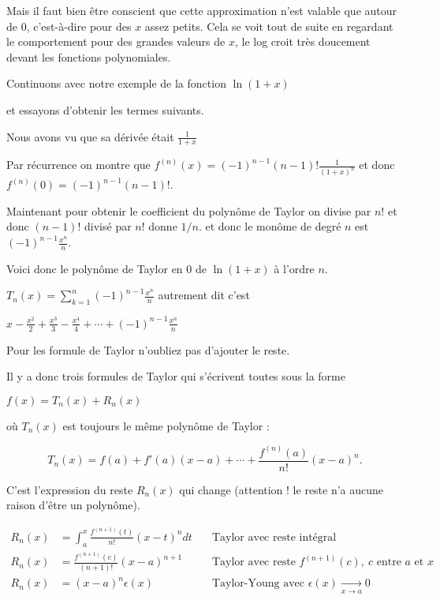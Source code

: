 Mais il faut bien être conscient que cette approximation n'est valable que autour 
de $0$, c'est-à-dire pour des $x$ assez petits.
Cela se voit tout de suite en regardant le comportement pour des grandes valeurs de $x$,
le log croit très doucement devant les fonctions polynomiales. 



\diapo


Continuons avec notre exemple de la fonction $\ln(1+x)$

et essayons d'obtenir les termes suivants.

\change

Nous avons vu que sa dérivée était $\frac{1}{1+x}$

\change

Par récurrence on montre que $f^{(n)}(x) = (-1)^{n-1} (n-1)!\frac{1}{(1+x)^n}$
et donc $f^{(n)}(0)= (-1)^{n-1} (n-1)!$.

\change

Maintenant pour obtenir le coefficient du polynôme de Taylor
on divise par $n!$ et donc $(n-1)!$ divisé par $n!$ donne $1/n$.
et donc le monôme de degré $n$ est $(-1)^{n-1}\frac{x^n}{n}$.

\change

Voici donc le polynôme de Taylor en $0$ de $\ln(1+x)$ à l'ordre $n$.

$T_n(x)=\sum_{k=1}^n (-1)^{n-1}\frac{x^n}{n}$
autrement dit c'est

$x-\frac{x^2}{2} + \frac{x^3}{3}-\frac{x^4}{4}+ \cdots + (-1)^{n-1}\frac{x^n}{n}$

Pour les formule de Taylor n'oubliez pas d'ajouter le reste.

\diapo

Il y a donc trois formules de Taylor qui s'écrivent toutes sous la forme

$f(x) = T_n(x) + R_n(x)$

\change

où $T_n(x)$ est toujours le même polynôme de Taylor :

$$T_n(x) =f(a)+f'(a)(x-a)+\cdots
+\frac{f^{(n)}(a)}{n!}(x-a)^n.$$

C'est l'expression du reste $R_n(x)$ qui change (attention ! le reste n'a aucune raison d'être un polynôme). 

\change


\begin{align*}
R_n(x) & = \int_a^x \frac{f^{(n+1)}(t)}{n!}(x-t)^ndt 
 & \quad   \text{Taylor avec reste intégral} \\
R_n(x) & =\frac{f^{(n+1)}(c)}{(n+1)!}(x-a)^{n+1}   
 & \quad   \text{Taylor avec reste } f^{(n+1)}(c),\   c \text{ entre } a \text{ et } x \\
R_n(x) & = (x-a)^n\epsilon(x) 
 & \quad \text{Taylor-Young avec } \epsilon(x) \xrightarrow[x\to a]{} 0 \\
\end{align*}

